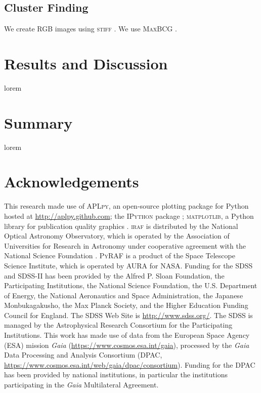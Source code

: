 \documentclass[apj, revtex4]{emulateapj}
\begin{document}
\subsection{Cluster Finding}
We create RGB images using \textsc{stiff} \citep{Bertin2011}.
We use \textsc{MaxBCG} \citep{Koester2007b}.

\section{Results and Discussion}\label{sec:results}

lorem

\section{Summary}\label{sec:summary}

lorem

\section*{Acknowledgements} This research made use of \textsc{APLpy}, an open-source plotting package for Python hosted at \url{http://aplpy.github.com}; the \textsc{IPython} package \citep{Perez2007}; \textsc{matplotlib}, a Python library for publication quality graphics \citep{Hunter2007}. \textsc{iraf} is distributed by the National Optical Astronomy Observatory, which is operated by the Association of Universities for Research in Astronomy under cooperative agreement with the National Science Foundation \citep{Tody1993}. \textsc{PyRAF} is a product of the Space Telescope Science Institute, which is operated by AURA for NASA. Funding for the SDSS and SDSS-II has been provided by the Alfred P. Sloan Foundation, the Participating Institutions, the National Science Foundation, the U.S. Department of Energy, the National Aeronautics and Space Administration, the Japanese Monbukagakusho, the Max Planck Society, and the Higher Education Funding Council for England. The SDSS Web Site is \url{http://www.sdss.org/}. The SDSS is managed by the Astrophysical Research Consortium for the Participating Institutions. This work has made use of data from the European Space Agency (ESA) mission {\it Gaia} (\url{https://www.cosmos.esa.int/gaia}), processed by the {\it Gaia} Data Processing and Analysis Consortium (DPAC, \url{https://www.cosmos.esa.int/web/gaia/dpac/consortium}). Funding for the DPAC has been provided by national institutions, in particular the institutions participating in the {\it Gaia} Multilateral Agreement.
\end{document}
